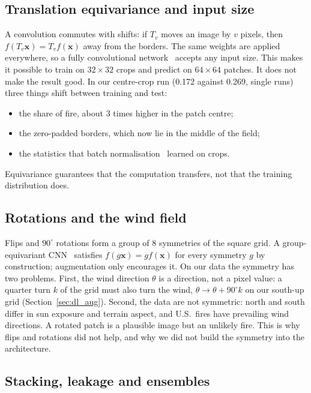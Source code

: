 \subsection{Translation equivariance and input size}

A convolution commutes with shifts: if $T_v$ moves an image by $v$ pixels, then
$f(T_v\mathbf{x}) = T_v f(\mathbf{x})$ away from the borders. The same weights are applied everywhere,
so a fully convolutional network~\cite{long2015} accepts any input size. This makes it possible to train
on $32\times32$ crops and predict on $64\times64$ patches. It does not make the result good. In our
centre-crop run (0.172 against 0.269, single runs) three things shift between training and test:
\begin{itemize}
\item the share of fire, about 3 times higher in the patch centre;
\item the zero-padded borders, which now lie in the middle of the field;
\item the statistics that batch normalisation~\cite{ioffe2015} learned on crops.
\end{itemize}
Equivariance guarantees that the computation transfers, not that the training distribution does.

\subsection{Rotations and the wind field}

Flips and $90^\circ$ rotations form a group of 8 symmetries of the square grid. A group-equivariant
CNN~\cite{cohen2016} satisfies $f(g\mathbf{x}) = g f(\mathbf{x})$ for every symmetry $g$ by
construction; augmentation only encourages it. On our data the symmetry has two problems. First, the
wind direction $\theta$ is a direction, not a pixel value: a quarter turn $k$ of the grid must also turn
the wind, $\theta \to \theta + 90^\circ k$ on our south-up grid (Section~\ref{sec:dl_aug}). Second, the
data are not symmetric: north and south differ in sun exposure and terrain aspect, and U.S.\ fires have
prevailing wind directions. A rotated patch is a plausible image but an unlikely fire. This is why flips
and rotations did not help, and why we did not build the symmetry into the architecture.

\subsection{Stacking, leakage and ensembles}

